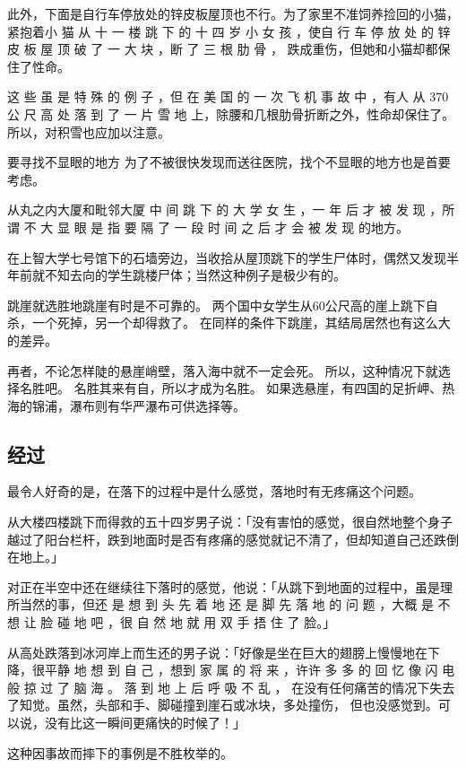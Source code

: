 \documentclass[UTF8]{ctexart}
\begin{document}
此外，下面是自行车停放处的锌皮板屋顶也不行。为了家里不准饲养捡回的小猫，紧抱着小 猫 从 十 一 楼 跳 下 的 十 四 岁 小 女 孩 ，使自 行 车 停 放 处 的 锌 皮 板 屋 顶 破 了 一 大 块 ，断 了 三 根 肋 骨 ， 跌成重伤，但她和小猫却都保住了性命。

这 些 虽 是 特 殊 的 例 子 ，但 在 美 国 的 一 次 飞 机 事 故 中 ，有人 从 $370$公 尺 高 处 落 到 了 一 片 雪 地 上，除腰和几根肋骨折断之外，性命却保住了。所以，对积雪也应加以注意。

要寻找不显眼的地方 为了不被很快发现而送往医院，找个不显眼的地方也是首要考虑。

从丸之内大厦和毗邻大厦 中 间 跳 下 的 大 学 女 生 ，一 年 后 才 被 发 现 ，所谓 不 大 显 眼 是 指 要 隔 了 一 段 时 间 之 后 才 会 被 发 现 的地方。

在上智大学七号馆下的石墙旁边，当收拾从屋顶跳下的学生尸体时，偶然又发现半 年前就不知去向的学生跳楼尸体；当然这种例子是极少有的。

跳崖就选胜地跳崖有时是不可靠的。
两个国中女学生从$60$公尺高的崖上跳下自杀，一个死掉，另一个却得救了。
在同样的条件下跳崖，其结局居然也有这么大的差异。

再者，不论怎样陡的悬崖峭壁，落入海中就不一定会死。
所以，这种情况下就选择名胜吧。
名胜其来有自，所以才成为名胜。
如果选悬崖，有四国的足折岬、热海的锦浦，瀑布则有华严瀑布可供选择等。

\subsection{经过}

最令人好奇的是，在落下的过程中是什么感觉，落地时有无疼痛这个问题。

从大楼四楼跳下而得救的五十四岁男子说：「没有害怕的感觉，很自然地整个身子越过了阳台栏杆，跌到地面时是否有疼痛的感觉就记不清了，但却知道自己还跌倒在地上。」

对正在半空中还在继续往下落时的感觉，他说：「从跳下到地面的过程中，虽是理所当然的事，但还 是 想 到 头 先 着 地 还 是 脚 先 落 地 的 问 题 ，大概 是 不 想 让 脸 碰 地 吧 ，很 自 然 地 就 用 双 手 捂 住 了 脸。」

从高处跌落到冰河岸上而生还的男子说：「好像是坐在巨大的翅膀上慢慢地在下降，很平静 地 想 到 自 己 ，想到 家 属 的 将 来 ，许许 多 多 的 回 忆 像 闪 电 般 掠 过 了 脑 海 。
落 到 地 上 后 呼 吸 不 乱 ， 在没有任何痛苦的情况下失去了知觉。虽然，头部和手、脚碰撞到崖石或冰块，多处撞伤， 但也没感觉到。可以说，没有比这一瞬间更痛快的时候了！」

 这种因事故而摔下的事例是不胜枚举的。
\end{document}
